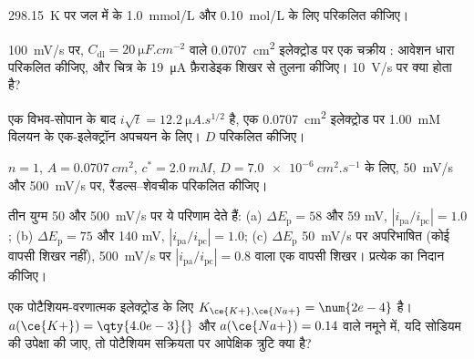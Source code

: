 \begin{exercise}[$\star$]\label{exo:b3:electrode-kinetics:3}
\qty{298.15}{K} पर जल में  के \qty{1.0}{mmol/L} और \qty{0.10}{mol/L}
के लिए  परिकलित कीजिए।
\end{exercise}

\begin{exercise}[$\star$]\label{exo:b3:electrode-kinetics:4}
\qty{100}{mV/s} पर, $C_{\mathrm{dl}} =
\qty{20}{\micro F.cm^{-2}}$ वाले \qty{0.0707}{cm^2} इलेक्ट्रोड पर एक चक्रीय : आवेशन धारा परिकलित कीजिए, और
चित्र के \qty{19}{\micro A} फ़ैराडेइक शिखर से तुलना कीजिए। \qty{10}{V/s} पर क्या होता है?
\end{exercise}

\begin{exercise}[$\star\star$]\label{exo:b3:electrode-kinetics:5}
एक विभव-सोपान के बाद $i\sqrt t = \qty{12.2}{\micro A.s^{1/2}}$ है, एक \qty{0.0707}{cm^2} इलेक्ट्रोड पर
\qty{1.00}{mM} विलयन के एक-इलेक्ट्रॉन अपचयन के लिए। $D$ परिकलित कीजिए।
\end{exercise}

\begin{exercise}[$\star\star$]\label{exo:b3:electrode-kinetics:6}
$n = 1$, $A = \qty{0.0707}{cm^2}$, $c^* = \qty{2.0}{mM}$,
$D = \qty{7.0e-6}{cm^2.s^{-1}}$ के लिए, \qty{50}{mV/s} और \qty{500}{mV/s} पर, रैंडल्स--शेवचीक  परिकलित कीजिए।
\end{exercise}

\begin{exercise}[$\star\star$]\label{exo:b3:electrode-kinetics:7}
तीन युग्म 50 और \qty{500}{mV/s} पर ये परिणाम देते हैं: (a) $\Delta E_{\mathrm p} = 58$ और 59 \unit{mV}, $|i_{\mathrm{pa}}/i_{\mathrm{pc}}| = 1.0$;
(b) $\Delta E_{\mathrm p} = 75$ और 140 \unit{mV}, $|i_{\mathrm{pa}}/i_{\mathrm{pc}}| = 1.0$; (c) $\Delta E_{\mathrm p}$ \qty{50}{mV/s} पर अपरिभाषित (कोई
वापसी शिखर नहीं), \qty{500}{mV/s} पर $|i_{\mathrm{pa}}/i_{\mathrm{pc}}| = 0.8$ वाला एक वापसी शिखर। प्रत्येक का निदान कीजिए।
\end{exercise}

\begin{exercise}[$\star\star$]\label{exo:b3:electrode-kinetics:8}
एक पोटैशियम-वरणात्मक इलेक्ट्रोड के लिए $K_{\ce{K+},\ce{Na+}} = \num{2e-4}$ है। $a(\ce{K+}) =
\qty{4.0e-3}{}$ और $a(\ce{Na+}) = 0.14$ वाले नमूने में, यदि सोडियम की उपेक्षा की जाए, तो पोटैशियम सक्रियता
पर आपेक्षिक त्रुटि क्या है?
\end{exercise}

